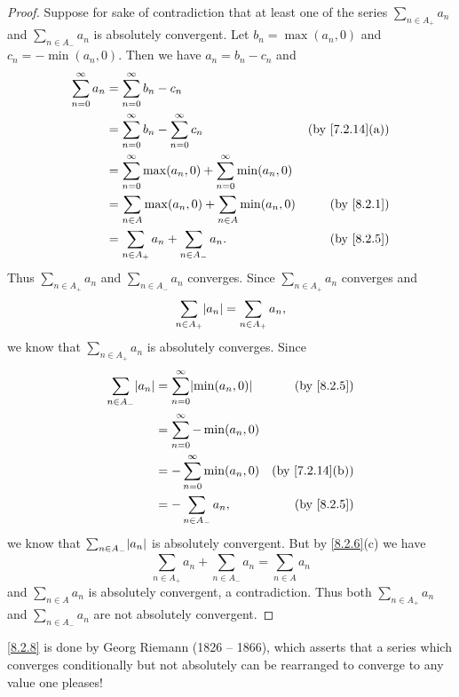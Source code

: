 \begin{proof}
  Suppose for sake of contradiction that at least one of the series \(\sum_{n \in A_+} a_n\) and \(\sum_{n \in A_-} a_n\) is absolutely convergent.
  Let \(b_n = \max(a_n, 0)\) and \(c_n = -\min(a_n, 0)\).
  Then we have \(a_n = b_n - c_n\) and
  \begin{align*}
    \sum_{n = 0}^\infty a_n & = \sum_{n = 0}^\infty b_n - c_n                                                                      \\
                            & = \sum_{n = 0}^\infty b_n - \sum_{n = 0}^\infty c_n                   & \text{(by \cref{7.2.14}(a))} \\
                            & = \sum_{n = 0}^\infty \max(a_n, 0) + \sum_{n = 0}^\infty \min(a_n, 0)                                \\
                            & = \sum_{n \in A} \max(a_n, 0) + \sum_{n \in A} \min(a_n, 0)           & \text{(by \cref{8.2.1})}     \\
                            & = \sum_{n \in A_+} a_n + \sum_{n \in A_-} a_n.                        & \text{(by \cref{8.2.5})}
  \end{align*}
  Thus \(\sum_{n \in A_+} a_n\) and \(\sum_{n \in A_-} a_n\) converges.
  Since \(\sum_{n \in A_+} a_n\) converges and
  \[
    \sum_{n \in A_+} \abs{a_n} = \sum_{n \in A_+} a_n,
  \]
  we know that \(\sum_{n \in A_+} a_n\) is absolutely converges.
  Since
  \begin{align*}
    \sum_{n \in A_-} \abs{a_n} & = \sum_{n = 0}^\infty \abs{\min(a_n, 0)} & \text{(by \cref{8.2.5})}     \\
                               & = \sum_{n = 0}^\infty -\min(a_n, 0)                                     \\
                               & = -\sum_{n = 0}^\infty \min(a_n, 0)      & \text{(by \cref{7.2.14}(b))} \\
                               & = -\sum_{n \in A_-} a_n,                 & \text{(by \cref{8.2.5})}
  \end{align*}
  we know that \(\sum_{n \in A_-} \abs{a_n}\) is absolutely convergent.
  But by \cref{8.2.6}(c) we have
  \[
    \sum_{n \in A_+} a_n + \sum_{n \in A_-} a_n = \sum_{n \in A} a_n
  \]
  and \(\sum_{n \in A} a_n\) is absolutely convergent, a contradiction.
  Thus both \(\sum_{n \in A_+} a_n\) and \(\sum_{n \in A_-} a_n\) are not absolutely convergent.
\end{proof}

\begin{note}
  \cref{8.2.8} is done by Georg Riemann (1826 -- 1866), which asserts that a series which converges conditionally but not absolutely can be rearranged to converge to any value one pleases!
\end{note}

